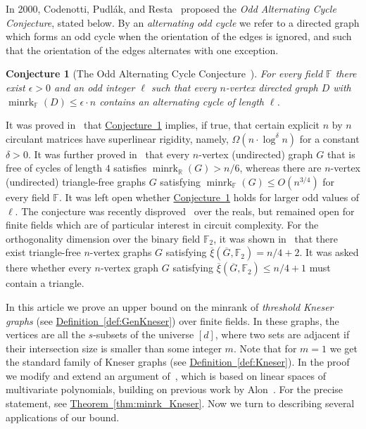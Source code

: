 \documentclass[11pt]{article}
\numberwithin{equation}{section}
\newtheorem{conjecture}[theorem]{Conjecture}
\theoremstyle{definition}
\theoremstyle{plain}
\newcommand{\R}{\mathbb R}
\newcommand{\expref}[2]{\hyperref[#2]{#1~\ref{#2}}}
\newcommand{\Fset}{\mathbb{F}}
\newcommand{\od}{\overline{\xi}}
\newcommand{\eps}{\epsilon}
\newcommand{\minrank}{\mathop{\mathrm{minrk}}}
\begin{document}
In 2000, Codenotti, Pudl{\'{a}}k, and Resta~\cite{CodenottiPR00} proposed the
\emph{Odd Alternating Cycle Conjecture}, stated below.
By an \emph{alternating odd cycle} we refer to a directed graph which forms an odd cycle when the orientation of the edges is ignored, and such that the orientation of the edges alternates with one exception.
\begin{conjecture}[The Odd Alternating Cycle Conjecture~\cite{CodenottiPR00}]\label{conj:alternating}
For every field $\Fset$ there exist $\eps >0$ and an odd integer $\ell$ such that every $n$-vertex directed graph $D$ with ${\minrank}_{\Fset} (D)  \leq \eps \cdot n$ contains an alternating cycle of length $\ell$.
\end{conjecture}

It was proved in~\cite{CodenottiPR00} that \expref{Conjecture}{conj:alternating} implies, if true, that certain explicit $n$ by $n$ circulant matrices have superlinear rigidity,
%
namely, $\Omega( n \cdot \log^\delta n)$ for a constant $\delta>0$.
%
%
%
%
%
%
%
It was further proved in~\cite{CodenottiPR00} that every $n$-vertex (undirected) graph $G$ that is free of cycles of length $4$ satisfies ${\minrank}_{\R}(G) > n/6$, whereas
%
there are $n$-vertex (undirected) triangle-free graphs $G$ satisfying ${\minrank}_{\Fset}(G) \leq O(n^{3/4})$ for every field $\Fset$.
%
It was left open whether
%
\expref{Conjecture}{conj:alternating} %
holds  %
for larger
%
odd
values of $\ell$.
%
%
The conjecture was recently disproved~\cite{Haviv18free} over the reals, %
but remained open for finite fields which are of %
particular %
interest in circuit complexity.
For the orthogonality dimension over the binary field $\Fset_2$, it was shown in~\cite{CodenottiPR00} that there exist triangle-free $n$-vertex graphs $G$ satisfying $\od(\overline{G},\Fset_2) = n/4+2$. It was asked there whether every $n$-vertex graph $G$ satisfying $\od(\overline{G},\Fset_2) \leq n/4+1$ must contain a triangle.

In this article
we prove %
an upper bound %
on the minrank
%
%
of \emph{threshold Kneser graphs}  %
(see \expref{Definition}{def:GenKneser})  %
over finite fields.  %
In these graphs, the vertices are all the $s$-subsets of %
the  %
universe $[d]$, where two sets are adjacent if their intersection size is smaller than some integer $m$. Note that for $m=1$ we get the standard family of Kneser graphs (see \expref{Definition}{def:Kneser}).
In the proof we modify and extend an argument of~\cite{Haviv18free}, which is based on linear spaces of multivariate polynomials, building on
%
previous work by  %
Alon~\cite{AlonUnion98}. For the precise statement, see \expref{Theorem}{thm:minrk_Kneser}.  %
Now we  %
turn to %
describing %
several applications of our bound.
\end{document}
